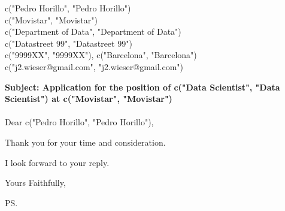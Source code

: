 \documentclass{letter}
\makeatletter
\newcommand{\letterdate}{c("1/1/2021", "2/1/2021")}
\newcommand{\jobopening}{c("Data Scientist", "Data Scientist")}
\newcommand{\companynameperson}{c("Pedro Horillo", "Pedro Horillo")}
\newcommand{\companyname}{c("Movistar", "Movistar")}
\newcommand{\companydepartment}{c("Department of Data", "Department of Data")}
\newcommand{\companystreet}{c("Datastreet 99", "Datastreet 99")}
\newcommand{\companypostal}{c("9999XX", "9999XX")}
\newcommand{\companycity}{c("Barcelona", "Barcelona")}
\newcommand{\companyemail}{c("j2.wieser@gmail.com", "j2.wieser@gmail.com")}
\makeatother
\begin{document}
\begin{letter}{\companynameperson \\ \companyname \\ \companydepartment \\ \companystreet \\ \companypostal, \companycity \\ \companyemail}


	\opening{
		{\bf Subject: Application for the position of {\jobopening} at \companyname} \\ ~ \\
	          Dear \companynameperson,
	}

%	

	Thank you for your time and consideration.

	I look forward to your reply.

	\closing{Yours Faithfully,}

	\ps


\end{letter}
\end{document}
